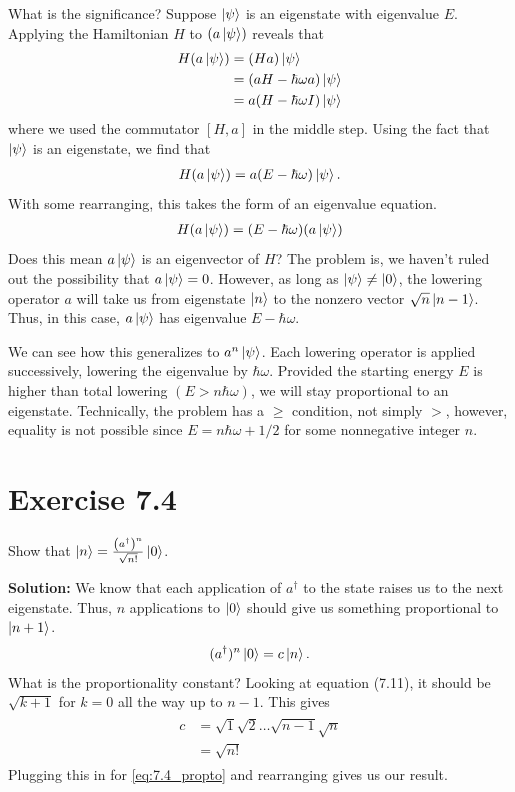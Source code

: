 \documentclass{book}
\begin{document}
    What is the significance? Suppose $\ket{\psi}$ is an eigenstate with eigenvalue $E$. Applying the Hamiltonian $H$ to $(a\ket{\psi})$ reveals that
    \begin{align}
    \begin{aligned}
        H (a\ket{\psi}) &= (Ha) \ket{\psi} \\
        &= (aH - \hbar \omega a)\ket{\psi} \\
        &= a(H- \hbar \omega I) \ket{\psi}
    \end{aligned}
    \end{align}
    where we used the commutator $[H,a]$ in the middle step. Using the fact that $\ket{\psi}$ is an eigenstate, we find that
    \begin{align}
        H(a\ket{\psi}) = a(E-\hbar\omega) \ket{\psi}.
    \end{align}
    With some rearranging, this takes the form of an eigenvalue equation.
    \begin{align}
        H(a\ket{\psi}) = (E-\hbar\omega) (a\ket{\psi})
    \end{align}
    Does this mean $a\ket{\psi}$ is an eigenvector of $H$? The problem is, we haven't ruled out the possibility that $a\ket{\psi} = 0$. However, as long as $\ket{\psi} \neq \ket{0}$, the lowering operator $a$ will take us from eigenstate $\ket{n}$ to the nonzero vector $\sqrt{n} \ket{n-1}$. Thus, in this case, $a\ket{\psi}$ has eigenvalue $E - \hbar \omega$.

    We can see how this generalizes to $a^n \ket{\psi}$. Each lowering operator is applied successively, lowering the eigenvalue by $\hbar \omega$. Provided the starting energy $E$ is higher than total lowering $(E > n \hbar \omega)$, we will stay proportional to an eigenstate. Technically, the problem has a $\geq$ condition, not simply $>$, however, equality is not possible since $E = n\hbar \omega + 1/2$ for some nonnegative integer $n$.

\section*{Exercise 7.4}
    Show that $\ket{n} = \frac{\left(a^\dagger\right)^n}{\sqrt{n!}} \ket{0}$.

    \textbf{Solution:} We know that each application of $a^\dagger$ to the state raises us to the next eigenstate. Thus, $n$ applications to $\ket{0}$ should give us something proportional to $\ket{n+1}$.
    \begin{align} \label{eq:7.4_propto}
        (a^\dagger)^n \ket{0} = c \ket{n}.
    \end{align}
    What is the proportionality constant? Looking at equation (7.11), it should be $\sqrt{k+1}$ for $k = 0$ all the way up to $n-1$. This gives
    \begin{align}
    \begin{aligned}
        c &= \sqrt{1}\sqrt{2} \dots \sqrt{n-1} \sqrt{n} \\
        &= \sqrt{n!}
    \end{aligned}
    \end{align}
    Plugging this in for \eqref{eq:7.4_propto} and rearranging gives us our result.
\end{document}
